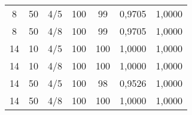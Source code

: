 \begin{table}[H]
\begin{tabular}{@{}ccccccc@{}}
8                                                     & 50                                                        & 4/5 & 100 & 99  & 0,9705        & 1,0000       \\
8                                                     & 50                                                        & 4/8 & 100 & 99  & 0,9705        & 1,0000       \\
14                                                    & 10                                                        & 4/5 & 100 & 100 & 1,0000        & 1,0000       \\
14                                                    & 10                                                        & 4/8 & 100 & 100 & 1,0000        & 1,0000       \\
14                                                    & 50                                                        & 4/5 & 100 & 98  & 0,9526        & 1,0000       \\
14                                                    & 50                                                        & 4/8 & 100 & 100 & 1,0000        & 1,0000       \\ \bottomrule
\end{tabular}
\end{table}


